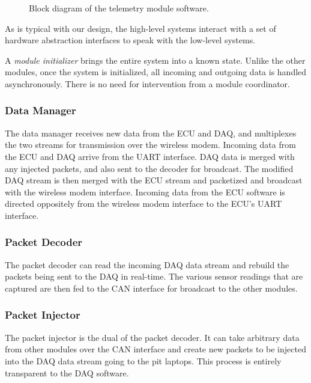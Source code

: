 \begin{figure}[H]
	\centering
	
	\caption{Block diagram of the telemetry module software.}
	\label{fig:design_telemetry_software_block}
\end{figure}

As is typical with our design, the high-level systems interact with a set of hardware abstraction interfaces to speak with the low-level systems. 

A \emph{module initializer} brings the entire system into a known state. Unlike the other modules, once the system is initialized, all incoming and outgoing data is handled asynchronously. There is no need for intervention from a module coordinator. 

\subsubsection{Data Manager}

The data manager receives new data from the ECU and DAQ, and multiplexes the two streams for transmission over the wireless modem. Incoming data from the ECU and DAQ arrive from the UART interface. DAQ data is merged with any injected packets, and also sent to the decoder for broadcast. The modified DAQ stream is then merged with the ECU stream and packetized and broadcast with the wireless modem interface. Incoming data from the ECU software is directed oppositely from the wireless modem interface to the ECU's UART interface.

\subsubsection{Packet Decoder}
\label{sec:design_telemetry_decoder}

The packet decoder can read the incoming DAQ data stream and rebuild the packets being sent to the DAQ in real-time. The various sensor readings that are captured are then fed to the CAN interface for broadcast to the other modules.

\subsubsection{Packet Injector}
\label{sec:design_telemetry_injector}

The packet injector is the dual of the packet decoder. It can take arbitrary data from other modules over the CAN interface and create new packets to be injected into the DAQ data stream going to the pit laptops. This process is entirely transparent to the DAQ software.

